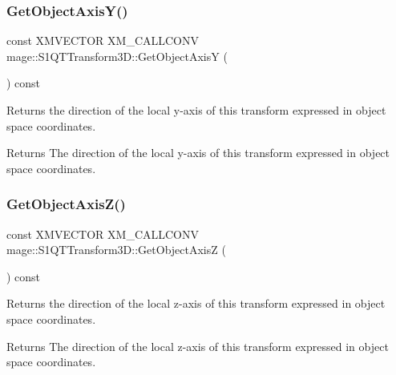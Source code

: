 \subsubsection{\texorpdfstring{Get\+Object\+Axis\+Y()}{GetObjectAxisY()}}
{\footnotesize\ttfamily const X\+M\+V\+E\+C\+T\+OR X\+M\+\_\+\+C\+A\+L\+L\+C\+O\+NV mage\+::\+S1\+Q\+T\+Transform3\+D\+::\+Get\+Object\+AxisY (\begin{DoxyParamCaption}{ }\end{DoxyParamCaption}) const\hspace{0.3cm}{\ttfamily [noexcept]}}

Returns the direction of the local y-\/axis of this transform expressed in object space coordinates.

\begin{DoxyReturn}{Returns}
The direction of the local y-\/axis of this transform expressed in object space coordinates. 
\end{DoxyReturn}
\mbox{\label{classmage_1_1_s1_q_t_transform3_d_ad84b6c5ba1ba1026fd986647e9297d61}} 
\subsubsection{\texorpdfstring{Get\+Object\+Axis\+Z()}{GetObjectAxisZ()}}
{\footnotesize\ttfamily const X\+M\+V\+E\+C\+T\+OR X\+M\+\_\+\+C\+A\+L\+L\+C\+O\+NV mage\+::\+S1\+Q\+T\+Transform3\+D\+::\+Get\+Object\+AxisZ (\begin{DoxyParamCaption}{ }\end{DoxyParamCaption}) const\hspace{0.3cm}{\ttfamily [noexcept]}}

Returns the direction of the local z-\/axis of this transform expressed in object space coordinates.

\begin{DoxyReturn}{Returns}
The direction of the local z-\/axis of this transform expressed in object space coordinates. 
\end{DoxyReturn}
\mbox{\label{classmage_1_1_s1_q_t_transform3_d_ab13ce1c9306f0753d490f9f67dfbe716}} 
